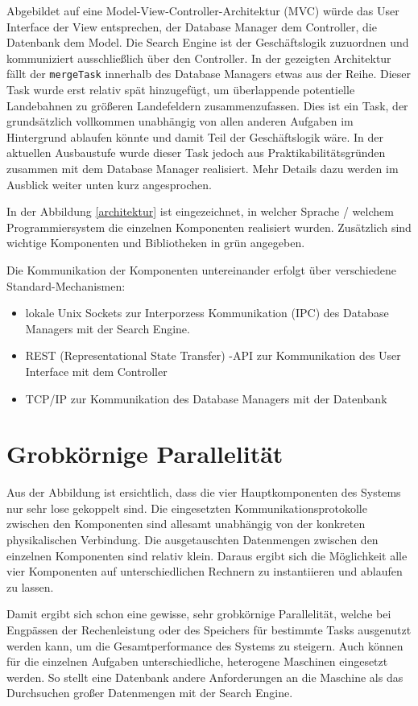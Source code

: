 \documentclass[10pt,a4paper]{report}
\begin{document}
Abgebildet auf eine Model-View-Controller-Architektur (MVC) würde das User Interface der View entsprechen, der Database Manager dem Controller, die Datenbank dem Model. Die Search Engine ist der Geschäftslogik zuzuordnen und kommuniziert ausschließlich über den Controller.
In der gezeigten Architektur fällt der \texttt{mergeTask} innerhalb des Database Managers etwas aus der Reihe. Dieser Task wurde erst relativ spät hinzugefügt, um überlappende potentielle Landebahnen zu größeren Landefeldern zusammenzufassen. Dies ist ein Task, der grundsätzlich vollkommen unabhängig von allen anderen Aufgaben im Hintergrund ablaufen könnte und damit Teil der Geschäftslogik wäre. In der aktuellen Ausbaustufe wurde dieser Task jedoch aus Praktikabilitätsgründen zusammen mit dem Database Manager realisiert. Mehr Details dazu werden im Ausblick weiter unten kurz angesprochen.

In der Abbildung \ref{architektur} ist eingezeichnet, in welcher Sprache / welchem Programmiersystem die einzelnen Komponenten realisiert wurden. Zusätzlich sind wichtige Komponenten und Bibliotheken in grün angegeben.

Die Kommunikation der Komponenten untereinander erfolgt über verschiedene Standard-Mechanismen:
\begin{itemize}
	\item lokale Unix Sockets zur Interporzess Kommunikation (IPC) des Database Managers mit der Search Engine.
	\item REST (Representational State Transfer) -API zur Kommunikation des User Interface mit dem Controller
	\item TCP/IP zur Kommunikation des Database Managers mit der Datenbank
\end{itemize}


\section{Grobkörnige Parallelität}
Aus der Abbildung ist ersichtlich, dass die vier Hauptkomponenten des Systems nur sehr lose gekoppelt sind. Die eingesetzten Kommunikationsprotokolle zwischen den Komponenten sind allesamt unabhängig von der konkreten physikalischen Verbindung. Die ausgetauschten Datenmengen zwischen den einzelnen Komponenten sind relativ klein. Daraus ergibt sich die Möglichkeit alle vier Komponenten auf unterschiedlichen Rechnern zu instantiieren und ablaufen zu lassen.

Damit ergibt sich schon eine gewisse, sehr grobkörnige Parallelität, welche bei Engpässen der Rechenleistung oder des Speichers für bestimmte Tasks ausgenutzt werden kann, um die Gesamtperformance des Systems zu steigern. Auch können für die einzelnen Aufgaben unterschiedliche, heterogene Maschinen eingesetzt werden. So stellt eine Datenbank andere Anforderungen an die Maschine als das Durchsuchen großer Datenmengen mit der Search Engine.
\end{document}
